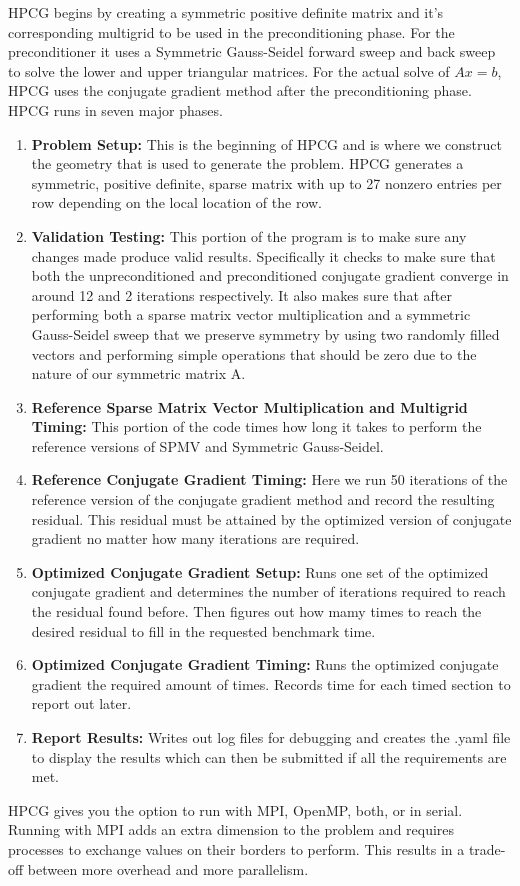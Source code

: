\documentclass{ccr15}
\begin{document}
HPCG begins by creating a symmetric positive definite matrix and it's corresponding multigrid
to be used in the preconditioning phase. For the preconditioner it uses a Symmetric Gauss-Seidel
forward sweep and back sweep to solve the lower and upper triangular matrices. For the actual
solve of $A x = b$, HPCG uses the conjugate gradient method after the preconditioning phase.
HPCG runs in seven major phases.
\begin{enumerate}
\item \textbf{Problem Setup:} This is the beginning of HPCG and is where we construct the
geometry that is used to generate the problem. HPCG generates a symmetric, positive definite,
sparse matrix with up to 27 nonzero entries per row depending on the local location of the row.
\item \textbf{Validation Testing:} This portion of the program is to make sure any changes
made produce valid results. Specifically it checks to make sure that both the unpreconditioned
and preconditioned conjugate gradient converge in around 12 and 2 iterations respectively. It
also makes sure that after performing both a sparse matrix vector multiplication and a symmetric
Gauss-Seidel sweep that we preserve symmetry by using two randomly filled vectors and
performing simple operations that should be zero due to the nature of our symmetric matrix A.
\item \textbf{Reference Sparse Matrix Vector Multiplication and Multigrid Timing:} This
portion of the code times how long it takes to perform the reference versions of SPMV and
Symmetric Gauss-Seidel.
\item \textbf{Reference Conjugate Gradient Timing:} Here we run 50 iterations of the reference
version of the conjugate gradient method and record the resulting residual. This residual must be
attained by the optimized version of conjugate gradient no matter how many iterations are
required.
\item \textbf{Optimized Conjugate Gradient Setup:} Runs one set of the optimized conjugate
gradient and determines the number of iterations required to reach the residual found before.
Then figures out how mamy times to reach the desired residual to fill in the requested benchmark
time.
\item \textbf{Optimized Conjugate Gradient Timing:} Runs the optimized conjugate gradient the
required amount of times. Records time for each timed section to report out later.
\item \textbf{Report Results:} Writes out log files for debugging and creates the .yaml file
to display the results which can then be submitted if all the requirements are met.
\end{enumerate}
HPCG gives you the option to run with MPI, OpenMP, both, or in serial. Running with MPI adds an
extra dimension to the problem and requires processes to exchange values on their borders to
perform. This results in a trade-off between more overhead and more parallelism.
\end{document}
